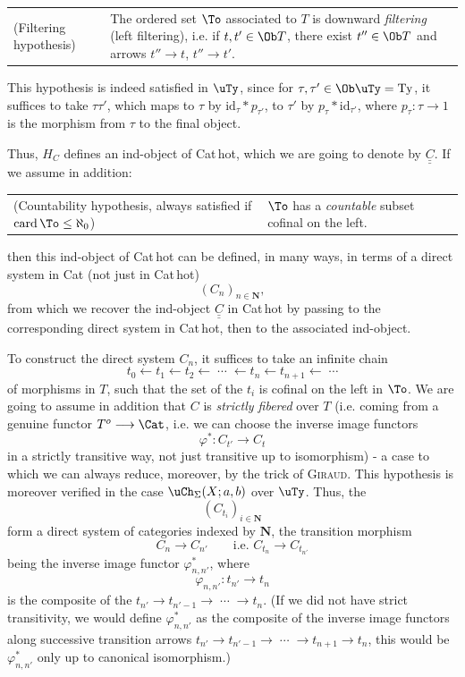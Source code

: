 \noindent\begin{tabular}{@{}p{}p{}@{}}
(Filtering hypothesis) & The ordered set $\To$ associated to $T$ is downward \textit{filtering} (left filtering), i.e. if $t,t' \in \Ob T$, there exist $t'' \in \Ob T$ and arrows $t'' \longrightarrow t$, $t'' \longrightarrow t'$.
\end{tabular}

This hypothesis is indeed satisfied in $\uTy$, since for $\tau,\tau' \in \Ob \uTy = \mathrm{Ty}$, it suffices to take $\tau\tau'$, which maps to $\tau$ by $\mathrm{id}_{\tau} * p_{\tau'}$, to $\tau'$ by $p_{\tau} * \mathrm{id}_{\tau'}$, where $p_{\tau} : \tau \longrightarrow 1$ is the morphism from $\tau$ to the final object.

Thus, $H_{C}$ defines an ind-object of Cat\,hot, which we are going to denote by $\underline{\underline{C}}$. If we assume in addition:

\noindent\begin{tabular}{@{}p{}p{}@{}}
(Countability hypothesis, always satisfied if $\mathrm{card}\,\To \leq \aleph_{0}$) & $\To$ has a \textit{countable} subset cofinal on the left.
\end{tabular}

then this ind-object of Cat\,hot can be defined, in many ways, in terms
of a direct system in Cat (not just in Cat\,hot)
\[
(C_{n})_{n\in\mathbf{N}},
\]
from which we recover the ind-object $\underline{\underline{C}}$ in Cat\,hot by passing to the corresponding direct system in Cat\,hot, then to the associated ind-object.

To construct the direct system $C_{n}$, it suffices to take an infinite chain
\[
t_{0} \longleftarrow t_{1} \longleftarrow t_{2} \longleftarrow \;\cdots\; \longleftarrow t_{n} \longleftarrow t_{n+1} \longleftarrow \;\cdots
\]
of morphisms in $T$, such that the set of the $t_{i}$ is cofinal on the left in $\To$. We are going to assume in addition that $C$ is \textit{strictly fibered} over $T$ (i.e. coming from a genuine functor $T^{o} \longrightarrow \Cat$, i.e. we can choose the inverse image functors
\[
\varphi^{*} : C_{t'} \longrightarrow C_{t}
\]
in a strictly transitive way, not just transitive up to isomorphism) - a case to which we can always reduce, moreover, by the trick of \textsc{Giraud}. This hypothesis is moreover verified in the case $\uCh_{\Sigma}(X;a,b)$ over $\uTy$. Thus, the
\[
(C_{t_{i}})_{i\in\mathbf{N}}
\]
form a direct system of categories indexed by $\mathbf{N}$, the transition morphism
\[
C_{n} \longrightarrow C_{n'} \qquad \text{i.e. } C_{t_{n}} \longrightarrow C_{t_{n'}}
\]
being the inverse image functor $\varphi^{*}_{n,n'}$, where
\[
\varphi_{n,n'} : t_{n'} \longrightarrow t_{n}
\]
is the composite of the $t_{n'} \longrightarrow t_{n'-1} \longrightarrow \;\cdots\; \longrightarrow t_{n}$. (If we did not have strict transitivity, we would define $\varphi^{*}_{n,n'}$ as the composite of the inverse image functors along successive transition arrows $t_{n'} \longrightarrow t_{n'-1} \longrightarrow \;\cdots\; \longrightarrow t_{n+1} \longrightarrow t_{n}$, this would be $\varphi^{*}_{n,n'}$ only up to canonical isomorphism.)

